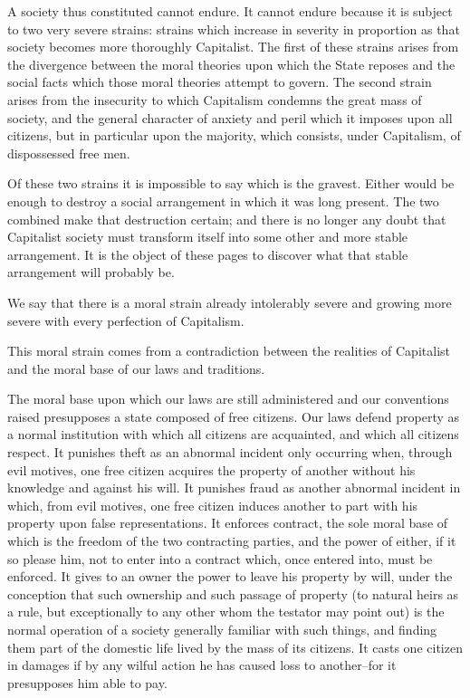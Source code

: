 \documentclass{book}
\begin{document}
A society thus constituted cannot endure. It cannot endure because it is subject to two very severe strains: strains which increase in severity in proportion as that society becomes more thoroughly Capitalist. The first of these strains arises from the divergence between the moral theories upon which the State reposes and the social facts which those moral theories attempt to govern. The second strain arises from the insecurity to which Capitalism condemns the great mass of society, and the general character of anxiety and peril which it imposes upon all citizens, but in particular upon the majority, which consists, under Capitalism, of dispossessed free men.

Of these two strains it is impossible to say which is the gravest. Either would be enough to destroy a social arrangement in which it was long present. The two combined make that destruction certain; and there is no longer any doubt that Capitalist society must transform itself into some other and more stable arrangement. It is the object of these pages to discover what that stable arrangement will probably be.

We say that there is a moral strain already intolerably severe and growing more severe with every perfection of Capitalism.

This moral strain comes from a contradiction between the realities of Capitalist and the moral base of our laws and traditions.

The moral base upon which our laws are still administered and our conventions raised presupposes a state composed of free citizens. Our laws defend property as a normal institution with which all citizens are acquainted, and which all citizens respect. It punishes theft as an abnormal incident only occurring when, through evil motives, one free citizen acquires the property of another without his knowledge and against his will. It punishes fraud as another abnormal incident in which, from evil motives, one free citizen induces another to part with his property upon false representations. It enforces contract, the sole moral base of which is the freedom of the two contracting parties, and the power of either, if it so please him, not to enter into a contract which, once entered into, must be enforced. It gives to an owner the power to leave his property by will, under the conception that such ownership and such passage of property (to natural heirs as a rule, but exceptionally to any other whom the testator may point out) is the normal operation of a society generally familiar with such things, and finding them part of the domestic life lived by the mass of its citizens. It casts one citizen in damages if by any wilful action he has caused loss to another–for it presupposes him able to pay.
\end{document}

